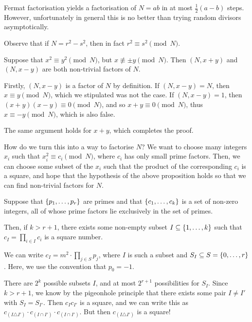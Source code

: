 \documentclass{article}
\begin{document}
\begin{note}
	Fermat factorisation yields a factorisation of $N = ab$ in at most $\frac{1}{2}(a-b)$ steps. However, unfortunately in general this is no better than trying random divisors asymptotically.
\end{note}

\begin{proposition}
	Observe that if $N = r^2 - s^2$, then in fact $r^2 \equiv s^2 \pmod N$.

    Suppose that $x^2 \equiv y^2 \pmod N$, but $x \not\equiv \pm y \pmod N$. Then $(N, x + y)$ and $(N, x - y)$ are both non-trivial factors of $N$.
\end{proposition}

\begin{prf}
    Firstly, $(N, x-y)$ is a factor of $N$ by definition. If $(N, x-y) = N$, then $x \equiv y \pmod N$, which we stipulated was not the case. If $(N, x-y) = 1$, then $(x+y)(x-y) \equiv 0 \pmod N$, and so $x+y \equiv 0 \pmod N$, thus $x \equiv -y \pmod N$, which is also false.
    
    The same argument holds for $x+y$, which completes the proof.
\end{prf}

How do we turn this into a way to factorise $N$? We want to choose many integers $x_i$ such that $x_i^2 \equiv c_i \pmod N$, where $c_i$ has only small prime factors. Then, we can choose some subset of the $x_i$ such that the product of the corresponding $c_i$ is a square, and hope that the hypothesis of the above proposition holds so that we can find non-trivial factors for $N$.

\begin{proposition}
    Suppose that $\left\lbrace p_1, \dots, p_r \right\rbrace$ are primes and that $\left\lbrace c_1, \dots, c_k \right\rbrace$ is a set of non-zero integers, all of whose prime factors lie exclusively in the set of primes.
    
    Then, if $k > r+1$, there exists some non-empty subset $I \subseteq \left\lbrace 1, \dots, k \right\rbrace$ such that $c_I = \prod_{i \in I} c_i$ is a square number.
\end{proposition}

\begin{prf}
    We can write $c_I = m^2 \cdot \prod_{j \in S} p_j$, where $I$ is such a subset and $S_I \subseteq S = \left\lbrace 0, \dots, r \right\rbrace$. Here, we use the convention that $p_0 = -1$.
    
    There are $2^k$ possible subsets $I$, and at most $2^{r+1}$ possibilities for $S_I$. Since $k > r+1$, we know by the pigeonhole principle that there exists some pair $I \neq I'$ with $S_{I} = S_{I'}$. Then $c_I c_{I'}$ is a square, and we can write this as $c_{(I \triangle I')} \cdot c_{(I \cap I')} \cdot c_{(I \cap I')}$. But then $c_{(I \triangle I')}$ is a square!
\end{prf}
\end{document}
